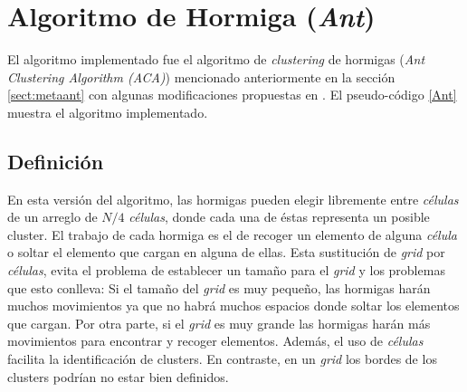 \section{Algoritmo de Hormiga (\emph{Ant})}  \label{sect:ihormiga}

    El algoritmo implementado fue el algoritmo de \emph{clustering} de 
hormigas (\emph{Ant Clustering Algorithm (ACA)}) mencionado anteriormente en la
sección \ref{sect:metaant} con algunas modificaciones propuestas en \cite{OuBa2007}.
El pseudo-código \ref{Ant} muestra el algoritmo implementado.

\subsection{Definición}

    En esta versión del algoritmo, las hormigas pueden elegir libremente entre
\emph{células} de un arreglo de $N/4$ \emph{células}, donde cada una de éstas
representa un posible cluster. El trabajo de cada hormiga es el de recoger un
elemento de alguna \emph{célula} o soltar el elemento que cargan en alguna de
ellas. Esta sustitución de \emph{grid} por \emph{células}, evita el problema de establecer
un tamaño para el \emph{grid} y los problemas que esto conlleva: Si el tamaño
del \emph{grid} es muy pequeño, las hormigas harán muchos movimientos ya que no
habrá muchos espacios donde soltar los elementos que cargan. Por otra parte, si
el \emph{grid} es muy grande las hormigas harán más movimientos para encontrar y
recoger elementos. Además, el uso de \emph{células} facilita la identificación
de clusters. En contraste, en un \emph{grid} los bordes de los clusters podrían
no estar bien definidos.

